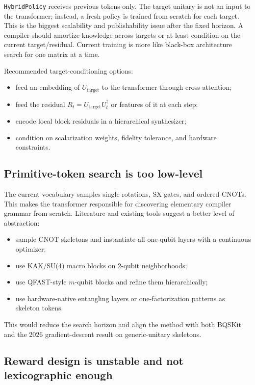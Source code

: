 \documentclass[11pt,a4paper]{article}
\newcommand{\Utarget}{U_{\mathrm{target}}}
\begin{document}
\texttt{HybridPolicy} receives previous tokens only. The target unitary is not
an input to the transformer; instead, a fresh policy is trained from scratch
for each target. This is the biggest scalability and publishability issue
after the fixed horizon. A compiler should amortize knowledge across targets
or at least condition on the current target/residual. Current training is more
like black-box architecture search for one matrix at a time.

Recommended target-conditioning options:
\begin{itemize}[leftmargin=2em]
  \item feed an embedding of $\Utarget$ to the transformer through cross-attention;
  \item feed the residual $R_t = \Utarget U_t^\dagger$ or features of it at each step;
  \item encode local block residuals in a hierarchical synthesizer;
  \item condition on scalarization weights, fidelity tolerance, and hardware constraints.
\end{itemize}

\subsection{Primitive-token search is too low-level}

The current vocabulary samples single rotations, SX gates, and ordered CNOTs.
This makes the transformer responsible for discovering elementary compiler
grammar from scratch. Literature and existing tools suggest a better level of
abstraction:
\begin{itemize}[leftmargin=2em]
  \item sample CNOT skeletons and instantiate all one-qubit layers with a
        continuous optimizer;
  \item use KAK/SU(4) macro blocks on 2-qubit neighborhoods;
  \item use QFAST-style $m$-qubit blocks and refine them hierarchically;
  \item use hardware-native entangling layers or one-factorization patterns
        as skeleton tokens.
\end{itemize}
This would reduce the search horizon and align the method with both BQSKit
and the 2026 gradient-descent result on generic-unitary skeletons.

\subsection{Reward design is unstable and not lexicographic enough}
\end{document}

